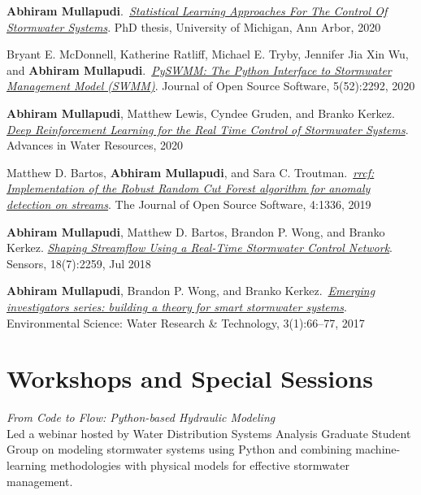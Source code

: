 \documentclass[a4paper,11pt]{article}
\newcommand{\years}[1]{%
  {\reversemarginpar\strut\marginnote{{\small#1}}}%
}
\begin{document}
\years{2020} \textbf{Abhiram Mullapudi}.\ \href{https://github.com/abhiramm7/UofM-Doc-Thesis/blob/master/Dissertation_Abhi.pdf}{\emph{Statistical Learning Approaches For The Control Of Stormwater Systems}}. PhD thesis, University of Michigan, Ann Arbor, 2020\\[.1cm]


\years{2020}  Bryant E. McDonnell, Katherine Ratliff, Michael E. Tryby, Jennifer Jia Xin Wu,
and \textbf{Abhiram Mullapudi}.\ \href{https://joss.theoj.org/papers/10.21105/joss.02292.pdf}{\emph{PySWMM: The Python Interface to Stormwater Management Model (SWMM)}}. Journal of Open Source Software, 5(52):2292, 2020\\[.1cm]


\years{2020}  \textbf{Abhiram Mullapudi}, Matthew Lewis, Cyndee Gruden, and Branko Kerkez.
\href{http://www.sciencedirect.com/science/article/pii/S0309170820302499}{\emph{Deep Reinforcement Learning for the Real Time Control of Stormwater Systems}}. Advances in Water Resources, 2020\\[.1cm]


\years{2019} Matthew D. Bartos, \textbf{Abhiram Mullapudi}, and Sara C. Troutman.\ \href{https://joss.theoj.org/papers/10.21105/joss.01336}{\emph{rrcf: Implementation of the Robust Random Cut Forest algorithm for anomaly detection on streams}}. The Journal of Open Source Software, 4:1336, 2019\\[.1cm]


\years{2018} \textbf{Abhiram Mullapudi}, Matthew D. Bartos, Brandon P. Wong, and Branko Kerkez.
\href{https://randomstorms.net/data/papers/shapingwater.pdf}{\emph{Shaping Streamflow Using a Real-Time Stormwater Control Network}}. Sensors, 18(7):2259, Jul 2018\\[.1cm]


\years{2017} \textbf{Abhiram Mullapudi}, Brandon P. Wong, and Branko Kerkez.\ \href{https://randomstorms.net/data/papers/stormwatertheory.pdf}{\emph{Emerging investigators series: building a theory for smart stormwater systems}}. Environmental Science: Water Research \& Technology, 3(1):66–77, 2017


\section*{Workshops and Special Sessions}
\years{2024} \emph{From Code to Flow: Python-based Hydraulic Modeling}\\[0.2cm]
Led a webinar hosted by Water Distribution Systems Analysis Graduate Student Group on modeling stormwater systems using Python and combining machine-learning methodologies with physical models for effective stormwater management.\\[.1cm]
\end{document}
